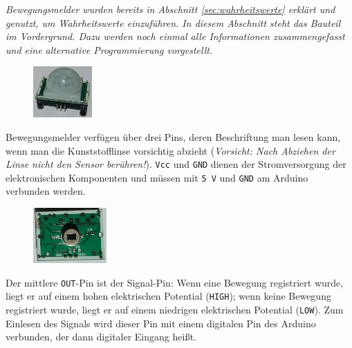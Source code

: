 \emph{Bewegungsmelder wurden bereits in Abschnitt \ref{sec:wahrheitswerte} erklärt und genutzt, um Wahrheitswerte einzuführen. In diesem Abschnitt steht das Bauteil im Vordergrund. Dazu werden noch einmal alle Informationen zusammengefasst und eine alternative Programmierung vorgestellt.}
\bigskip

\begin{figure}
	\centering
	\vspace{-\baselineskip}
	\includegraphics[width=0.2\textwidth]{./pics/bewegungsmelder.jpg}
	\label{abb:bewegungsmelder2}
	\vspace{-\baselineskip}
\end{figure}
Bewegungsmelder verfügen über drei Pins, deren Beschriftung man lesen kann, wenn man die Kunststofflinse vorsichtig abzieht (\emph{Vorsicht: Nach Abziehen der Linse nicht den Sensor berühren!}). \texttt{Vcc} und \texttt{GND} dienen der Stromversorgung der elektronischen Komponenten und müssen mit \texttt{5\,V} und \texttt{GND} am Arduino verbunden werden. 

\begin{figure}
	\centering
	\vspace{-0.5\baselineskip}
	\includegraphics[width=0.25\textwidth]{pics/bewegungsmelder-ohne-linse.jpg}
	\label{abb:bewegungsmelder-ohne-linse2}
	\vspace{-0.5\baselineskip}
\end{figure}
Der mittlere \texttt{OUT}-Pin ist der Signal-Pin: Wenn eine Bewegung registriert wurde, liegt er auf einem hohen elektrischen Potential (\texttt{HIGH}); wenn keine Bewegung registriert wurde, liegt er auf einem niedrigen elektrischen Potential (\texttt{LOW}). Zum Einlesen des Signals wird dieser Pin mit einem digitalen Pin des Arduino verbunden, der dann digitaler Eingang heißt.

